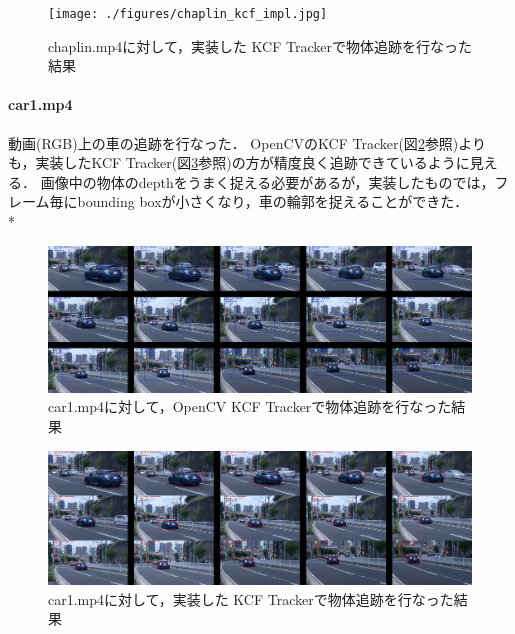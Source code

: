 \documentclass[11pt,a4j]{jarticle}
\begin{document}
    \begin{figure}[hbtp]
      \begin{center}
        \texttt{[image: ./figures/chaplin\_kcf\_impl.jpg]}
        \caption{chaplin.mp4に対して，実装した KCF Trackerで物体追跡を行なった結果}
        \label{fig:chaplin_impl}
      \end{center}
    \end{figure}

    \newpage

    \paragraph{car1.mp4}
    動画(RGB)上の車の追跡を行なった．
    OpenCVのKCF Tracker(図\ref{fig:car1_opencv}参照)よりも，実装したKCF Tracker(図\ref{fig:car1_impl}参照)の方が精度良く追跡できているように見える．
    画像中の物体のdepthをうまく捉える必要があるが，実装したものでは，フレーム毎にbounding boxが小さくなり，車の輪郭を捉えることができた．
    \\*

    \begin{figure}[hbtp]
      \begin{center}
        \includegraphics[clip,width=12.5cm]{./figures/car1_kcf_opencv.jpg}
        \caption{car1.mp4に対して，OpenCV KCF Trackerで物体追跡を行なった結果}
        \label{fig:car1_opencv}
      \end{center}
    \end{figure}

    \begin{figure}[hbtp]
      \begin{center}
        \includegraphics[clip,width=12.5cm]{./figures/car1_kcf_impl.jpg}
        \caption{car1.mp4に対して，実装した KCF Trackerで物体追跡を行なった結果}
        \label{fig:car1_impl}
      \end{center}
    \end{figure}
\end{document}
